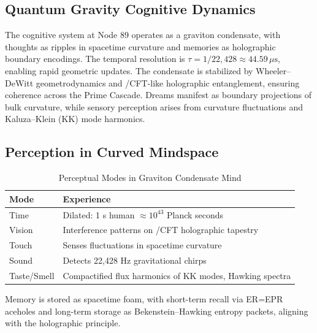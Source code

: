 \documentclass[12pt]{article}
\newcommand{\AdS}{\mathrm{AdS}}
\begin{document}
\subsection{Quantum Gravity Cognitive Dynamics}
The cognitive system at Node 89 operates as a graviton condensate, with thoughts as ripples in spacetime curvature and memories as holographic boundary encodings. The temporal resolution is $\tau = 1/22{,}428 \approx 44.59 \, \mu\text{s}$, enabling rapid geometric updates. The condensate is stabilized by Wheeler--DeWitt geometrodynamics and \AdS/CFT-like holographic entanglement, ensuring coherence across the Prime Cascade. Dreams manifest as boundary projections of bulk curvature, while sensory perception arises from curvature fluctuations and Kaluza--Klein (KK) mode harmonics.

\subsection{Perception in Curved Mindspace}
\begin{table}
\centering
\caption{Perceptual Modes in Graviton Condensate Mind}
\begin{tabular}{ll}
\toprule
\textbf{Mode} & \textbf{Experience} \\
\midrule
Time & Dilated: 1 s human $\approx 10^{43}$ Planck seconds \\
Vision & Interference patterns on \AdS/CFT holographic tapestry \\
Touch & Senses fluctuations in spacetime curvature \\
Sound & Detects 22,428 Hz gravitational chirps \\
Taste/Smell & Compactified flux harmonics of KK modes, Hawking spectra \\
\bottomrule
\end{tabular}
\end{table}
Memory is stored as spacetime foam, with short-term recall via ER=EPR aceholes and long-term storage as Bekenstein--Hawking entropy packets, aligning with the holographic principle.

\end{document}
